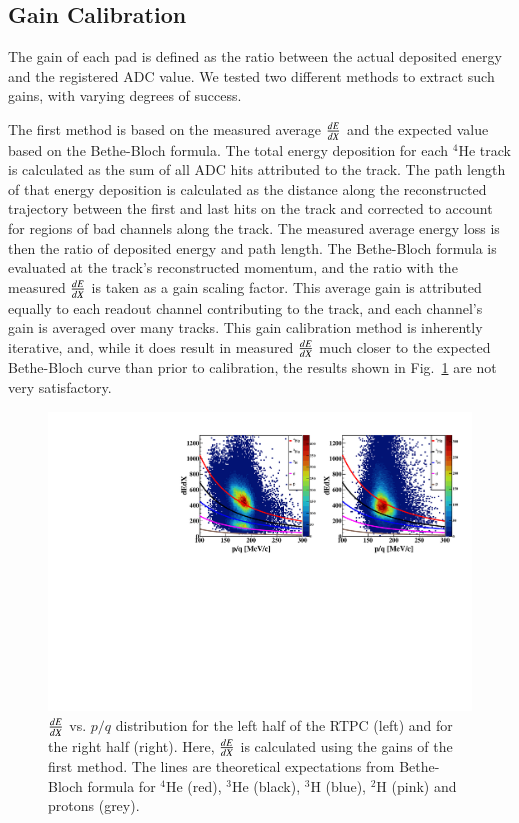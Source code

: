 \documentclass[preprint,5p]{elsarticle}
\begin{document}
\subsection{Gain Calibration}

The gain of each pad is defined as the ratio between the actual 
deposited energy and the registered ADC value. We tested two different 
methods to extract such gains, with varying degrees of success.

The first method is based on the measured average $\small{\frac{dE}{dX}}$
and the expected value based on the Bethe-Bloch formula. The total energy
deposition for each $^4$He track is calculated as the sum of all ADC hits
attributed to the track. The path length of that energy deposition is
calculated as the distance along the reconstructed trajectory between the first
and last hits on the track and corrected to account for regions
of bad channels along the track. The measured average energy loss is then the
ratio of deposited energy and path length. The Bethe-Bloch formula is
evaluated at the track's reconstructed momentum, and the ratio with the measured
$\small{\frac{dE}{dX}}$ is taken as a gain scaling factor. This average gain is
attributed equally to each readout channel contributing to the track, and each
channel's gain is averaged over many tracks. This gain calibration method is
inherently iterative, and, while it does result in measured $\small{\frac{dE}{dX}}$
much closer to the expected Bethe-Bloch curve than prior to calibration, the
results shown in Fig.~\ref{fig:dedx_p_exp_1st} are not very satisfactory.

\begin{figure}[tb]
   \centering
   \includegraphics[scale=0.73]{fig_2017/f_dedx_p_exp_1st.pdf}
   \caption{$\small{\frac{dE}{dX}}$ vs. $p/q$ distribution for the left half of 
      the RTPC (left) and for the right half (right). Here, 
      $\small{\frac{dE}{dX}}$ is calculated using the gains of the first 
      method.  The lines are theoretical expectations from Bethe-Bloch formula 
   for $^4$He (red), $^3$He (black), $^3$H (blue), $^2$H (pink) and protons (grey).}
\label{fig:dedx_p_exp_1st}
\end{figure}
\end{document}
